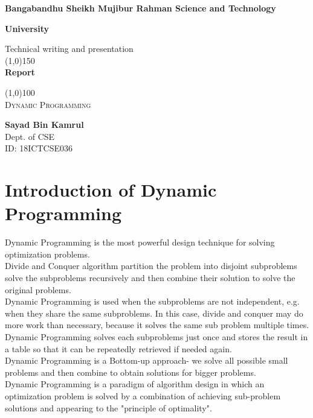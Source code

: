 \documentclass[11pt]{article}
\begin{document}
\begin{titlepage}

\textbf{Bangabandhu Sheikh Mujibur Rahman Science and Technology}
\begin{center}
\textbf{University\\}

\bigskip
\bigskip
\bigskip
\medskip
\bigskip
\bigskip
\medskip

Technical writing and presentation\\
\line(1,0){150}\\
[5mm]
\huge {\bfseries Report\\}

\line(1,0){100}\\
[.5mm]
\textsc{\Large Dynamic Programming}

\end{center} 
\vfill

\begin{flushright}

\textbf{\large Sayad Bin Kamrul\\}
Dept. of CSE\\ 
ID: 18ICTCSE036\\

\end{flushright}
\end{titlepage}

\section*{Introduction of Dynamic Programming\\}
Dynamic Programming is the most powerful design technique for solving optimization problems.\\
Divide and Conquer algorithm partition the problem into disjoint subproblems solve the subproblems recursively and then combine their solution to solve the original problems.\\
Dynamic Programming is used when the subproblems are not independent, e.g. when they share the same subproblems. In this case, divide and conquer may do more work than necessary, because it solves the same sub problem multiple times.\\
Dynamic Programming solves each subproblems just once and stores the result in a table so that it can be repeatedly retrieved if needed again.\\
Dynamic Programming is a Bottom-up approach- we solve all possible small problems and then combine to obtain solutions for bigger problems.\\
Dynamic Programming is a paradigm of algorithm design in which an optimization problem is solved by a combination of achieving sub-problem solutions and appearing to the "principle of optimality".\\
\end{document}
